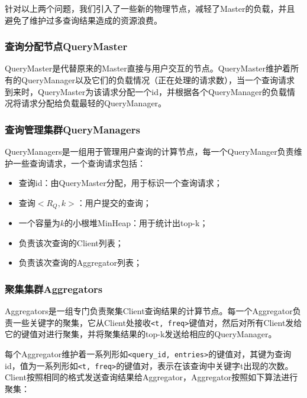 \documentclass{elegantpaper}
\begin{document}
\noindent 针对以上两个问题，我们引入了一些新的物理节点，减轻了Master的负载，并且避免了维护过多查询结果造成的资源浪费。

\subsubsection{查询分配节点QueryMaster}

QueryMaster是代替原来的Master直接与用户交互的节点。QueryMaster维护着所有的QueryManager以及它们的负载情况（正在处理的请求数），当一个查询请求到来时，QueryMaster为该请求分配一个id，并根据各个QueryManager的负载情况将请求分配给负载最轻的QueryManager。

\subsubsection{查询管理集群QueryManagers}

QueryManagers是一组用于管理用户查询的计算节点，每一个QueryManger负责维护一些查询请求，一个查询请求包括：

\begin{itemize}

    \item 查询id：由QueryMaster分配，用于标识一个查询请求；
    
    \item 查询$<R_Q, k>$：用户提交的查询；
    
    \item 一个容量为$k$的小根堆MinHeap：用于统计出top-k；
    
    \item 负责该次查询的Client列表；
    
    \item 负责该次查询的Aggregator列表；
    
\end{itemize}

\subsubsection{聚集集群Aggregators}

Aggregators是一组专门负责聚集Client查询结果的计算节点。每一个Aggregator负责一些关键字的聚集，它从Client处接收\verb|<t, freq>|键值对，然后对所有Client发给它的键值对进行聚集，并将聚集结果的top-k发送给相应的QueryManager。

\noindent 每个Aggregator维护着一系列形如\verb|<query_id, entries>|的键值对，其键为查询id，值为一系列形如\verb|<t, freq>|的键值对，表示在该查询中关键字t出现的次数。Client按照相同的格式发送查询结果给Aggregator，Aggregator按照如下算法进行聚集：\\\\\\\\\\\\\\\\\\\\\\\\
\end{document}
